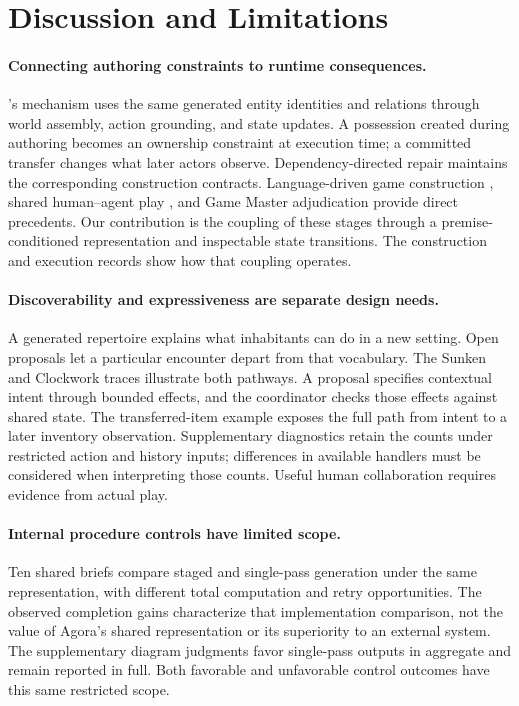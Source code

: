 \section{Discussion and Limitations}
\label{sec:discussion}

\paragraph{Connecting authoring constraints to runtime consequences.}
\agora's mechanism uses the same generated entity identities and relations
through world assembly, action grounding, and state updates. A possession
created during authoring becomes an ownership constraint at execution time;
a committed transfer changes what later actors observe. Dependency-directed
repair maintains the corresponding construction contracts. Language-driven
game construction \cite{word2world,dreamgarden}, shared human--agent play
\cite{light}, and Game Master adjudication \cite{vezhnevets2023} provide direct
precedents. Our contribution is the coupling of these stages through a
premise-conditioned representation and inspectable state transitions.
The construction and execution records show how that coupling operates.

\paragraph{Discoverability and expressiveness are separate design needs.}
A generated repertoire explains what inhabitants can do in a new setting.
Open proposals let a particular encounter depart from that vocabulary.
The Sunken and Clockwork traces illustrate both pathways. A proposal specifies
contextual intent through bounded effects, and the coordinator checks those
effects against shared state. The transferred-item example exposes the full
path from intent to a later inventory observation. Supplementary diagnostics
retain the counts under restricted action and history inputs; differences
in available handlers must be considered when interpreting those counts.
Useful human collaboration requires evidence from actual play.

\paragraph{Internal procedure controls have limited scope.}
Ten shared briefs compare staged and single-pass generation under the same
representation, with different total computation and retry opportunities.
The observed completion gains characterize that implementation comparison,
not the value of Agora's shared representation or its superiority to an
external system. The supplementary diagram judgments favor single-pass
outputs in aggregate and remain reported in full. Both favorable and
unfavorable control outcomes have this same restricted scope.

